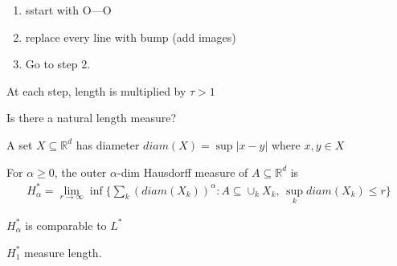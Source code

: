 \begin{example}
	\begin{enumerate}
		\item sstart with O---O
		\item replace every line with bump (add images)
		\item Go to step 2.
	\end{enumerate}
	At each step, length is multiplied by $\tau > 1$
\end{example}
Is there a natural length measure?

\begin{definition}
	A set $X \subseteq \mathbb{R}^d$ has diameter $diam(X) = \sup|x - y |$ where $x, y \in X$
\end{definition}

\begin{definition}
	For $\alpha \geq 0$, the outer $\alpha$-dim Hausdorff measure of $A \subseteq \mathbb{R}^d$ is
	\begin{align*}
		H_{\alpha}^* = \lim_{r \to \infty} \inf\{ \sum_{k} \left(diam(X_{k}) \right)^{\alpha} : A \subseteq \cup_{k} X_k, \,
		\sup_{k} diam(X_k) \leq r \}
	\end{align*} 

	$H_{\alpha}^*$ is comparable to $L^*$ 

	$H_{1}^*$ measure length.
\end{definition}

